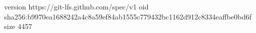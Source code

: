 version https://git-lfs.github.com/spec/v1
oid sha256:b9970ea1688242a4c8a59ef84ab1555c779432bc1162d912c8334eaffbe0bd6f
size 4457

